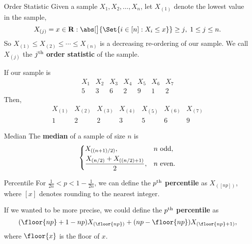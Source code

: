 \begin{Definition}{Order Statistic}{}
    Given a sample $ X_1,X_2,\ldots,X_n $,
    let $ X_{(1)} $ denote the lowest value in the sample,
    \[ X_{(j)}=\min{x\in\mathbf{R}:\abs[\big]{\Set{i\in[n]:X_i\le x}}\ge j},\; 1\le j\le n. \]
    So $ X_{(1)}\le X_{(2)}\le \cdots\le X_{(n)} $
    is a decreasing re-ordering of our sample. We call $ X_{(j)} $
    the $ j\textsuperscript{th} $ \textbf{order statistic} of the sample.
\end{Definition}
\begin{Example}{}{}
    If our sample is
    \[ \begin{array}{c|c|c|c|c|c|c}
            X_1 & X_2 & X_3 & X_4 & X_5 & X_6 & X_7 \\
            \hline
            5   & 3   & 6   & 2   & 9   & 1   & 2
        \end{array} \]
    Then,
    \[ \begin{array}{c|c|c|c|c|c|c}
            X_{(1)} & X_{(2)} & X_{(3)} & X_{(4)} & X_{(5)} & X_{(6)} & X_{(7)} \\
            \hline
            1       & 2       & 2       & 3       & 5       & 6       & 9
        \end{array} \]
\end{Example}
\begin{Definition}{Median}{}
    The \textbf{median} of a sample of size $ n $ is
    \[ \begin{dcases}
            X_{((n+1)/2)},                     & n\text{ odd},  \\
            \frac{X_{(n/2)}+X_{((n/2)+1)}}{2}, & n\text{ even}.
        \end{dcases} \]
\end{Definition}
\begin{Definition}{Percentile}{}
    For $ \frac{1}{2n}<p<1-\frac{1}{2n} $, we can define the
    $ p\textsuperscript{th} $ \textbf{percentile} as
    $ X_{([np])} $, where $ [x] $ denotes rounding to the nearest integer.

    If we wanted to be more precise, we could define the $ p\textsuperscript{th} $
    \textbf{percentile} as
    \[ (\floor{np}+1-np)X_{(\floor{np})}+
        (np-\floor{np})X_{(\floor{np}+1)}, \]
    where $ \floor{x} $ is the floor of $ x $.
\end{Definition}
